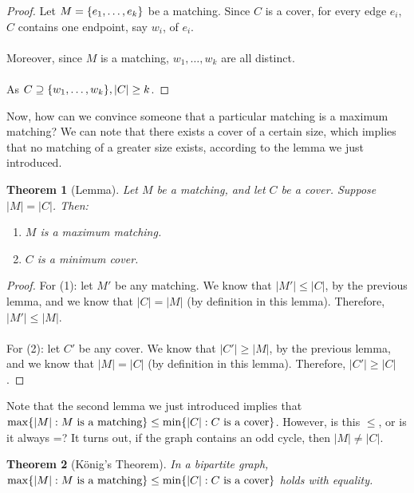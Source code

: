 \documentclass[]{article}
\newtheorem*{theorem}{Theorem}
\theoremstyle{definition}
\DeclarePairedDelimiter{\set}{\lbrace}{\rbrace}
\begin{document}
			\begin{proof}
				Let $M = \set{e_1, \ldots, e_k}$ be a matching. Since $C$ is a cover, for every edge $e_i$, $C$ contains one endpoint, say $w_i$, of $e_i$.
				\\ \\
				Moreover, since $M$ is a matching, $w_1, \ldots, w_k$ are all distinct.
				\\ \\
				As $C \supseteq \set{w_1, \ldots, w_k}, |C| \ge k$.
			\end{proof}
			
			Now, how can we convince someone that a particular matching is a maximum matching? We can note that there exists a cover of a certain size, which implies that no matching of a greater size exists, according to the lemma we just introduced.
			
			\begin{theorem}[Lemma]
				Let $M$ be a matching, and let $C$ be a cover. Suppose $|M| = |C|$. Then:
				\begin{enumerate}
					\item $M$ is a maximum matching.
					\item $C$ is a minimum cover.
				\end{enumerate}
			\end{theorem}
			
			\begin{proof}
				For (1): let $M'$ be any matching. We know that $|M'| \le |C|$, by the previous lemma, and we know that $|C| = |M|$ (by definition in this lemma). Therefore, $|M'| \le |M|$.
				\\ \\
				For (2): let $C'$ be any cover. We know that $|C'| \ge |M|$, by the previous lemma, and we know that $|M| = |C|$ (by definition in this lemma). Therefore, $|C'| \ge |C|$.
			\end{proof}
			
			Note that the second lemma we just introduced implies that $\max \set{|M| : M \text{ is a matching}} \le \min \set{|C| : C \text{ is a cover}}$. However, is this $\le$, or is it always =? It turns out, if the graph contains an odd cycle, then $|M| \ne |C|$.
			
			\begin{theorem}[K\"onig's Theorem]
				In a bipartite graph, $\max \set{|M| : M \text{ is a matching}} \le \min \set{|C| : C \text{ is a cover}}$ holds with equality.
			\end{theorem}
			
\end{document}
